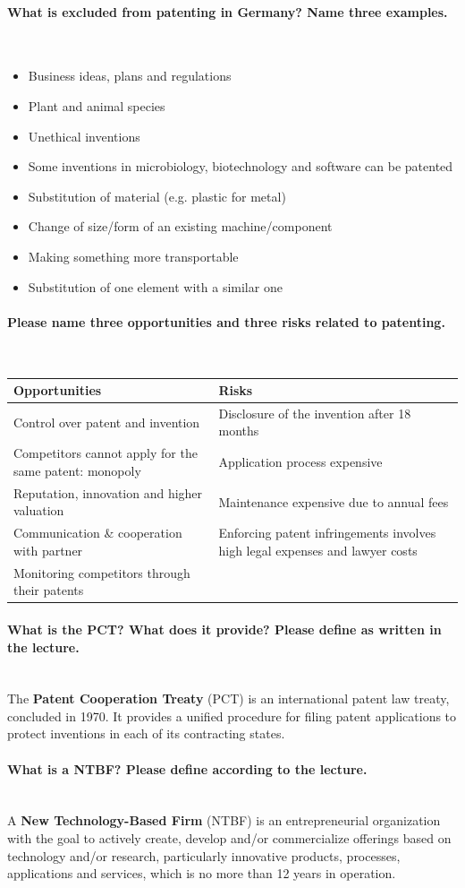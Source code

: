 \documentclass[10pt,a4paper,noendnumber=true]{scrartcl}
\newcommand{\properparagraph}[1]{\paragraph{\textcolor{Emerald}{#1}}\mbox{}\\}
\begin{document}
\properparagraph{What is excluded from patenting in Germany? Name three examples.}
\begin{itemize}
	\item Business ideas, plans and regulations
	\item Plant and animal species
	\item Unethical inventions
	\item Some inventions in microbiology, biotechnology and software can be patented
	\item Substitution of material (e.g. plastic for metal)
	\item Change of size/form of an existing machine/component
	\item Making something more transportable
	\item Substitution of one element with a similar one
\end{itemize}


\properparagraph{Please name three opportunities and three risks related to patenting.}


\begin{table}[tbh!]
		\centering
		\begin{tabularx}{\textwidth}{lX}
			\toprule
			\textbf{Opportunities} & \textbf{Risks} \\
			\midrule
			Control over patent and invention	& Disclosure of the invention after 18 months\\
			Competitors cannot apply for the same patent: monopoly			& Application process expensive\\
			Reputation, innovation and higher valuation	& Maintenance expensive due to annual fees\\
			Communication \& cooperation with partner	& Enforcing patent infringements involves high legal expenses and lawyer costs\\
			Monitoring competitors through their patents	& \\
			\bottomrule
		\end{tabularx}
\end{table}
\properparagraph{What is the PCT? What does it provide? Please define as written in the lecture.}
The \textbf{Patent Cooperation Treaty} (PCT) is an international patent law treaty, concluded in 1970. It provides a unified procedure for filing patent applications to protect inventions in each of its contracting states.

\properparagraph{What is a NTBF? Please define according to the lecture.}
A \textbf{New Technology-Based Firm} (NTBF) is an entrepreneurial organization with the goal to actively create, develop and/or commercialize offerings based on technology and/or research, particularly innovative products, processes, applications and services, which is no more than 12 years in operation.
\end{document}
